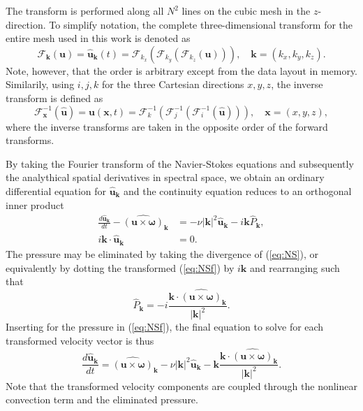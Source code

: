 \documentclass[11pt, oneside]{article}
\begin{document}
The transform is performed along all $N^2$ lines on the cubic mesh in the $z$-direction. To simplify notation, the complete three-dimensional transform for the entire mesh used in this work is denoted as
\begin{equation}
\mathcal{F}_{\bm{k}}(\bm{u}) = \hat{\bm{u}}_{\bm{k}}(t) = \mathcal{F}_{k_x}\left(\mathcal{F}_{k_y}\left(\mathcal{F}_{k_z}(\bm{u})\right)\right), \quad \bm{k}=(k_x, k_y, k_z).
\end{equation}
Note, however, that the order is arbitrary except from the data layout in memory. Similarily, using $i,j,k$ for the three Cartesian directions $x,y,z$, the inverse transform is defined as
\begin{equation}
\mathcal{F}^{-1}_{\bm{x}}(\hat{\bm{u}}) = \bm{u}(\bm{x}, t) = \mathcal{F}^{-1}_{k}\left(\mathcal{F}^{-1}_{j}\left(\mathcal{F}^{-1}_{i}(\hat{\bm{u}})\right)\right), \quad \bm{x} = (x, y, z),
\end{equation}
where the inverse transforms are taken in the opposite order of the forward transforms.

By taking the Fourier transform of the Navier-Stokes equations and subsequently the analythical spatial derivatives in spectral space, we obtain an ordinary differential equation for $\hat{\bm{u}}_{\bm{k}}$ and the continuity equation reduces to an orthogonal inner product
\begin{align}
 \frac{d\hat{\bm{u}}_{\bm{k}}}{d t} - \widehat{( \bm{u} \times \bm{\omega})}_{\bm{k}} &= - \nu |\bm{k}|^2  \hat{\bm{u}}_{\bm{k}} - i \bm{k} \hat{P}_{\bm{k}}, \label{eq:NSf} \\
 i \bm{k} \cdot \hat{\bm{u}}_{\bm{k}} &= 0.
\end{align}
The pressure may be eliminated by taking the divergence of (\ref{eq:NS}), or equivalently by dotting the transformed (\ref{eq:NSf}) by $i \bm{k}$ and rearranging such that
\begin{equation}
\hat{P}_{\bm{k}} = -i \frac{\bm{k} \cdot \widehat{( \bm{u} \times \bm{\omega})}_{\bm{k}} }{|\bm{k}|^2}.
\end{equation}
Inserting for the pressure in (\ref{eq:NSf}), the final equation to solve for each transformed velocity vector is thus
\begin{equation}
 \frac{d\hat{\bm{u}}_{\bm{k}}}{d t}  = \widehat{( \bm{u} \times \bm{\omega})}_{\bm{k}} - \nu |\bm{k}|^2  \hat{\bm{u}}_{\bm{k}} - \bm{k} \frac{\bm{k} \cdot \widehat{( \bm{u} \times \bm{\omega})}_{\bm{k}} }{|\bm{k}|^2}. \label{eq:NSfinal}
\end{equation}
Note that the transformed velocity components are coupled through the nonlinear convection term and the eliminated pressure.
\end{document}
